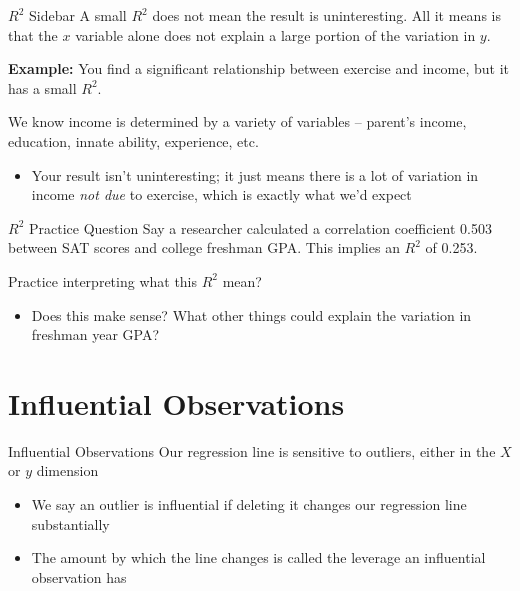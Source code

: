 \documentclass[aspectratio=169,t,11pt,table]{beamer}
\begin{document}
\begin{frame}{$R^2$ Sidebar}
  A small $R^2$ does not mean the result is uninteresting. All it means is that the $x$ variable alone does not explain a large portion of the variation in $y$.
  
  \pause
  \bigskip  
  \textbf{Example:} You find a significant relationship between exercise and income, but it has a small $R^2$. 
  
  \medskip
  We know income is determined by a variety of variables -- parent's income, education, innate ability, experience, etc. 
  
  \begin{itemize}
    \item Your result isn't uninteresting; it just means there is a lot of variation in income \emph{not due} to exercise, which is exactly what we'd expect
  \end{itemize}
\end{frame}

\begin{frame}{$R^2$ Practice Question}
  Say a researcher calculated a correlation coefficient 0.503 between SAT scores and college freshman GPA. This implies an $R^2$ of 0.253. 
  
  \bigskip
  Practice interpreting what this $R^2$ mean? 
  \begin{itemize}
    \item Does this make sense? What other things could explain the variation in freshman year GPA?
  \end{itemize}
\end{frame}

\section{Influential Observations}

\begin{frame}{Influential Observations}
  Our regression line is sensitive to \alert{outliers}, either in the $X$ or $y$ dimension 
  \begin{itemize}
    \item We say an outlier is \alert{influential} if deleting it changes our regression line substantially
    
    \item The amount by which the line changes is called the \alert{leverage} an influential observation has
  \end{itemize}
\end{frame}
\end{document}
